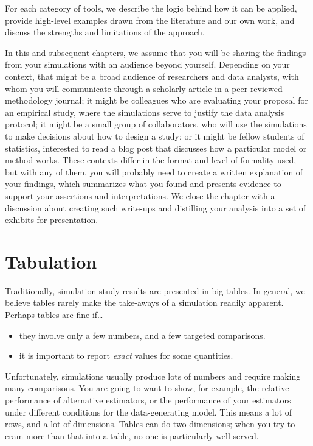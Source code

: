 \documentclass[
]{book}
\providecommand{\tightlist}{%
  \setlength{\itemsep}{0pt}\setlength{\parskip}{0pt}}
\begin{document}
For each category of tools, we describe the logic behind how it can be applied, provide high-level examples drawn from the literature and our own work, and discuss the strengths and limitations of the approach.

In this and subsequent chapters, we assume that you will be sharing the findings from your simulations with an audience beyond yourself. Depending on your context, that might be a broad audience of researchers and data analysts, with whom you will communicate through a scholarly article in a peer-reviewed methodology journal; it might be colleagues who are evaluating your proposal for an empirical study, where the simulations serve to justify the data analysis protocol; it might be a small group of collaborators, who will use the simulations to make decisions about how to design a study; or it might be fellow students of statistics, interested to read a blog post that discusses how a particular model or method works.
These contexts differ in the format and level of formality used, but with any of them, you will probably need to create a written explanation of your findings, which summarizes what you found and presents evidence to support your assertions and interpretations.
We close the chapter with a discussion about creating such write-ups and distilling your analysis into a set of exhibits for presentation.

\section{Tabulation}\label{tabulation}

Traditionally, simulation study results are presented in big tables.
In general, we believe tables rarely make the take-aways of a simulation readily apparent.
Perhaps tables are fine if\ldots{}

\begin{itemize}
\tightlist
\item
  they involve only a few numbers, and a few targeted comparisons.
\item
  it is important to report \emph{exact} values for some quantities.
\end{itemize}

Unfortunately, simulations usually produce lots of numbers and require making many comparisons.
You are going to want to show, for example, the relative performance of alternative estimators, or the performance of your estimators under different conditions for the data-generating model.
This means a lot of rows, and a lot of dimensions.
Tables can do two dimensions; when you try to cram more than that into a table, no one is particularly well served.
\end{document}
